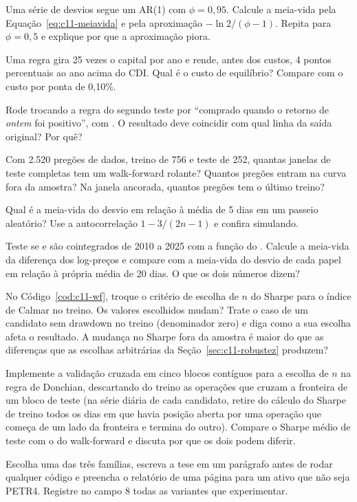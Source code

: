 \begin{exercicios}
  \item {} Uma série de desvios segue um AR(1) com $\phi = 0,95$. Calcule a meia-vida pela Equação~\eqref{eq:c11-meiavida} e pela aproximação $-\ln 2/(\phi - 1)$. Repita para $\phi = 0,5$ e explique por que a aproximação piora.
  \item {} Uma regra gira 25 vezes o capital por ano e rende, antes dos custos, 4 pontos percentuais ao ano acima do CDI. Qual é o custo de equilíbrio? Compare com o custo por ponta de 0,10\%.
  \item {} Rode  trocando a regra do segundo teste por ``comprado quando o retorno de \emph{ontem} foi positivo'', com . O resultado deve coincidir com qual linha da saída original? Por quê?
  \item {} Com 2.520 pregões de dados, treino de 756 e teste de 252, quantas janelas de teste completas tem um walk-forward rolante? Quantos pregões entram na curva fora da amostra? Na janela ancorada, quantos pregões tem o último treino?
  \item {} Qual é a meia-vida do desvio em relação à média de 5 dias em um passeio aleatório? Use a autocorrelação $1 - 3/(2n-1)$ e confira simulando.
  \item {} Teste se  e  são cointegrados de 2010 a 2025 com a função  do . Calcule a meia-vida da diferença dos log-preços e compare com a meia-vida do desvio de cada papel em relação à própria média de 20 dias. O que os dois números dizem?
  \item {} No Código~\ref{cod:c11-wf}, troque o critério de escolha de $n$ do Sharpe para o índice de Calmar no treino. Os valores escolhidos mudam? Trate o caso de um candidato sem drawdown no treino (denominador zero) e diga como a sua escolha afeta o resultado. A mudança no Sharpe fora da amostra é maior do que as diferenças que as escolhas arbitrárias da Seção~\ref{sec:c11-robustez} produzem?
  \item {} Implemente a validação cruzada em cinco blocos contíguos para a escolha de $n$ na regra de Donchian, descartando do treino as operações que cruzam a fronteira de um bloco de teste (na série diária de cada candidato, retire do cálculo do Sharpe de treino todos os dias em que havia posição aberta por uma operação que começa de um lado da fronteira e termina do outro). Compare o Sharpe médio de teste com o do walk-forward e discuta por que os dois podem diferir.
  \item {} Escolha uma das três famílias, escreva a tese em um parágrafo antes de rodar qualquer código e preencha o relatório de uma página para um ativo que não seja PETR4. Registre no campo 8 todas as variantes que experimentar.
\end{exercicios}

